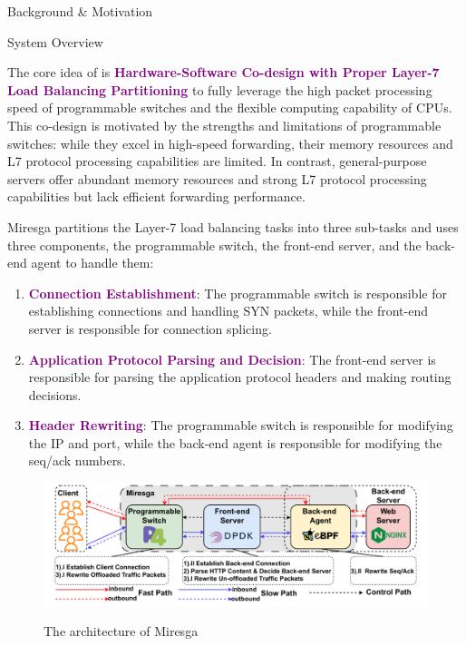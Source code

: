 \documentclass[final, 24pt]{beamer}
\newlength{\colwidth}
\begin{document}
\begin{frame}[t]
\begin{columns}[t]
\begin{column}{\colwidth}
\begin{block}{Background \& Motivation}
  \end{block}

  \begin{alertblock}{System Overview}

    The core idea of is \textcolor{purple}{\textbf{Hardware-Software Co-design with Proper Layer-7 Load Balancing Partitioning}} to fully leverage the high packet processing speed of programmable switches and the flexible computing capability of CPUs. This co-design is motivated by the strengths and limitations of programmable switches: while they excel in high-speed forwarding, their memory resources and L7 protocol processing capabilities are limited. In contrast, general-purpose servers offer abundant memory resources and strong L7 protocol processing capabilities but lack efficient forwarding performance.
    
    Miresga partitions the Layer-7 load balancing tasks into three sub-tasks and uses three components, the programmable switch, the front-end server, and the back-end agent to handle them:
    \begin{enumerate}
      \justifying
      \item \textcolor{purple}{\textbf{Connection Establishment}}: The programmable switch is responsible for establishing connections and handling SYN packets, while the front-end server is responsible for connection splicing.
      \item \textcolor{purple}{\textbf{Application Protocol Parsing and Decision}}: The front-end server is responsible for parsing the application protocol headers and making routing decisions.
      \item \textcolor{purple}{\textbf{Header Rewriting}}: The programmable switch is responsible for modifying the IP and port, while the back-end agent is responsible for modifying the seq/ack numbers.
    \end{enumerate}

    \begin{figure}
      \centering
      \includegraphics[width=0.9\colwidth]{pic/Miresga_Arch.pdf}
      \label{fig:architecture}
      \caption{The architecture of Miresga}
    \end{figure}


\end{alertblock}
\end{column}
\end{columns}
\end{frame}
\end{document}
